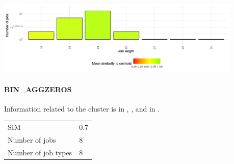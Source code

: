 \documentclass[]{llncs}
\begin{document}
\begingroup
  \centering
  \includegraphics[width=4.61in,height=1.39in]{./media/image9.png}
  \label{fig:use_case:bin_all:length}
\endgroup

\paragraph{BIN\_AGGZEROS}
Information related to the cluster is in , , and in .

\begingroup
  \centering
  \begin{tabular}{ll}
    SIM & 0.7 \\
    Number of jobs & 8 \\
    Number of job types & 8 \\
  \end{tabular}
  \label{tab:use_case:bin_aggzeros:stats}
\endgroup
\end{document}
